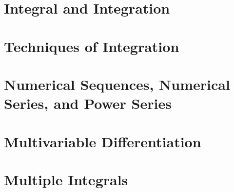 \documentclass[11pt]{book}
\theoremstyle{break}
\theoremstyle{no_label}
\numberwithin{equation}{section}
\begin{document}
\chapter{Integral and Integration}



\chapter{Techniques of Integration}



\chapter{Numerical Sequences, Numerical Series, and Power Series}



\chapter{Multivariable Differentiation}



\chapter{Multiple Integrals}
\end{document}
